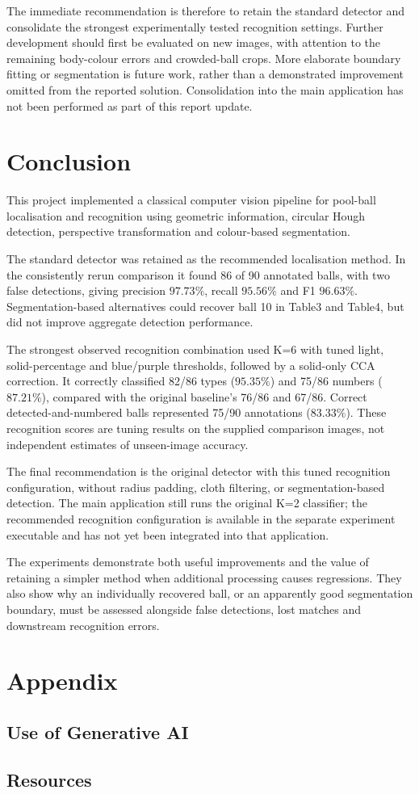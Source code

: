 \documentclass[10pt,a4paper]{article}
\begin{document}
The immediate recommendation is therefore to retain the standard detector
and consolidate the strongest experimentally tested recognition settings.
Further development should first be evaluated on new images, with attention
to the remaining body-colour errors and crowded-ball crops. More elaborate
boundary fitting or segmentation is future work, rather than a demonstrated
improvement omitted from the reported solution. Consolidation into the main
application has not been performed as part of this report update.

\section{Conclusion}

This project implemented a classical computer vision pipeline for pool-ball 
localisation and recognition using geometric information, circular Hough 
detection, perspective transformation and colour-based segmentation.

The standard detector was retained as the recommended localisation method.
In the consistently rerun comparison it found 86 of 90 annotated balls,
with two false detections, giving precision $97.73\%$, recall $95.56\%$
and F1 $96.63\%$. Segmentation-based alternatives could recover ball 10
in Table3 and Table4, but did not improve aggregate detection performance.

The strongest observed recognition combination used K=6 with tuned light,
solid-percentage and blue/purple thresholds, followed by a solid-only CCA
correction. It correctly classified 82/86 types ($95.35\%$) and 75/86
numbers ($87.21\%$), compared with the original baseline's 76/86 and
67/86. Correct detected-and-numbered balls represented 75/90 annotations
($83.33\%$). These recognition scores are tuning results on the supplied
comparison images, not independent estimates of unseen-image accuracy.

The final recommendation is the original detector with this tuned recognition
configuration, without radius padding, cloth filtering, or segmentation-based
detection. The main application still runs the original K=2 classifier;
the recommended recognition configuration is available in the separate
experiment executable and has not yet been integrated into that application.

The experiments demonstrate both useful improvements and the value of
retaining a simpler method when additional processing causes regressions.
They also show why an individually recovered ball, or an apparently good
segmentation boundary, must be assessed alongside false detections, lost
matches and downstream recognition errors.

\section{Appendix}
\subsection{Use of Generative AI}
\subsection{Resources}
\end{document}
